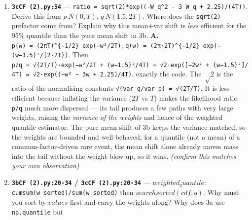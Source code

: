 \documentclass[
  11pt,
]{article}
\begin{document}
\begin{enumerate}
  \(exp(-1.5 w + 1.125)\) at \(T=1\). Why is only \(W\) reweighted and
  not the \(B_i\) (\texttt{:44})? \textbf{A.} The likelihood ratio is
  \texttt{p(w)/q(w)\ =\ exp(−w²/2T)\ /\ exp(−(w−μ)²/2T)\ =\ exp({[}−w²\ +\ (w−μ)²{]}/2T)\ =\ exp((−2μw\ +\ μ²)/2T)\ =\ exp(−(μ/T)w\ +\ μ²/(2T))}
  with \(μ = mu_shift = 1.5\). That is exactly
  \texttt{exp(−(mu\_shift/T)W\_q\ +\ mu\_shiftsq)}. At \(T=1\),
  \texttt{μ²/(2T)\ =\ 2.25/2\ =\ 1.125}, so
  \(ratio = exp(−1.5 w + 1.125)\), confirming the comment. Only \(W\) is
  reweighted because the importance shift was applied only to the
  \emph{common} factor \(W\) (sampled from \(N(1.5,T)\) on line 43); the
  idiosyncratic \(B_i\) are still drawn from their original \(N(0,T)\)
  (line 44), so their density is unchanged and contributes a factor of 1
  to \texttt{p/q}. Shifting only \(W\) is enough because the rare event
  (many \(S_i > K\)) is driven by the common factor.
\item
  \textbf{\texttt{3cCF\ (2).py:54}} ---
  \texttt{ratio\ =\ sqrt(2)*exp((-W\_q\^{}2\ -\ 3\ W\_q\ +\ 2.25)/(4T))}.
  Derive this from \(p~N(0,T)\), \(q~N(1.5,2T)\). Where does the
  \texttt{sqrt(2)} prefactor come from? Explain why this mean+var shift
  is \emph{less} efficient for the 95\% quantile than the pure mean
  shift in 3b. \textbf{A.}
  \texttt{p(w)\ =\ (2πT)\^{}\{−1/2\}\ exp(−w²/2T)},
  \texttt{q(w)\ =\ (2π·2T)\^{}\{−1/2\}\ exp(−(w−1.5)²/(2·2T))}. Then
  \texttt{p/q\ =\ √(2T/T)·exp(−w²/2T\ +\ (w−1.5)²/4T)\ =\ √2·exp({[}−2w²\ +\ (w−1.5)²{]}/4T)\ =\ √2·exp((−w²\ −\ 3w\ +\ 2.25)/4T)},
  exactly the code. The \(√2\) is the ratio of the normalising constants
  \texttt{√(var\_q/var\_p)\ =\ √(2T/T)}. It is less efficient because
  inflating the variance (\(2T\) vs \(T\)) makes the likelihood ratio
  \texttt{p/q} much more dispersed --- its tail produces a few paths
  with very large weights, raising the \emph{variance of the weights}
  and hence of the weighted quantile estimator. The pure mean shift of
  3b keeps the variance matched, so the weights are bounded and
  well-behaved; for a quantile (not a mean) of a common-factor-driven
  rare event, the mean shift alone already moves mass into the tail
  without the weight blow-up, so it wins. \emph{(confirm this matches
  your own observation)}
\item
  \textbf{\texttt{3bCF\ (2).py:20-34} / \texttt{3cCF\ (2).py:20-34}} ---
  \(weighted_quantile\): \texttt{cumsum(w\_sorted)/sum(w\_sorted)} then
  \(searchsorted(cdf, q)\). Why must you sort by \(values\) first and
  carry the weights along? Why does 3a use \texttt{np.quantile} but

\end{enumerate}
\end{document}
